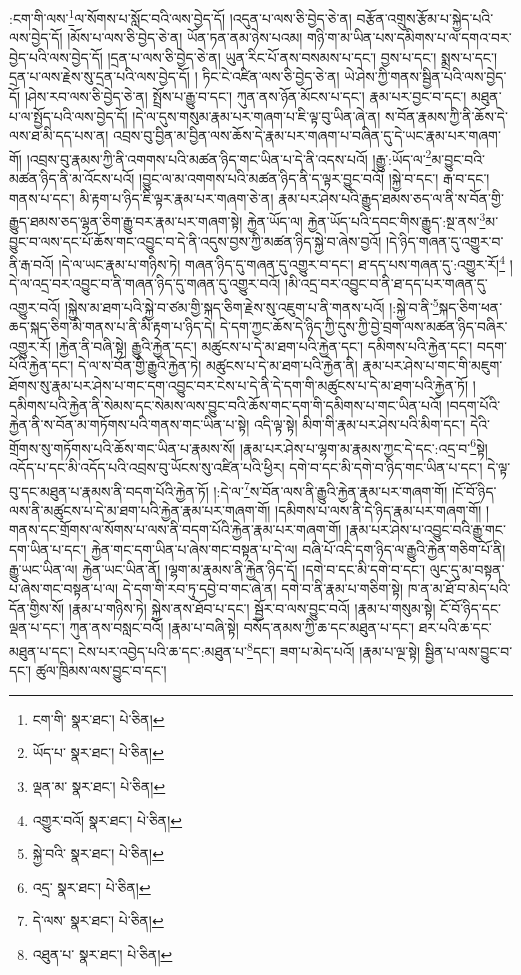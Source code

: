 :ངག་གི་ལས་\footnote{ངག་གི་  སྣར་ཐང་།  པེ་ཅིན། }ལ་སོགས་པ་སློང་བའི་ལས་བྱེད་དོ། །འདུན་པ་ལས་ཅི་བྱེད་ཅེ་ན། བརྩོན་འགྲུས་རྩོམ་པ་སྐྱེད་པའི་ལས་བྱེད་དོ། །མོས་པ་ལས་ཅི་བྱེད་ཅེ་ན། ཡོན་ཏན་ནམ་ཉེས་པའམ། གཉི་ག་མ་ཡིན་པས་དམིགས་པ་ལ་དགའ་བར་བྱེད་པའི་ལས་བྱེད་དོ། །དྲན་པ་ལས་ཅི་བྱེད་ཅེ་ན། ཡུན་རིང་པོ་ནས་བསམས་པ་དང་། བྱས་པ་དང་། སྨྲས་པ་དང་། དྲན་པ་ལས་རྗེས་སུ་དྲན་པའི་ལས་བྱེད་དོ། །
ཏིང་ངེ་འཛིན་ལས་ཅི་བྱེད་ཅེ་ན། ཡེ་ཤེས་ཀྱི་གནས་སྦྱིན་པའི་ལས་བྱེད་དོ། །ཤེས་རབ་ལས་ཅི་བྱེད་ཅེ་ན། སྤྲོས་པ་རྒྱུ་བ་དང་། ཀུན་ནས་ཉོན་མོངས་པ་དང་། རྣམ་པར་བྱང་བ་དང་། མཐུན་པ་ལ་སྤྱོད་པའི་ལས་བྱེད་དོ། །དེ་ལ་དུས་གསུམ་རྣམ་པར་གཞག་པ་ཇི་ལྟ་བུ་ཡིན་ཞེ་ན། ས་བོན་རྣམས་ཀྱི་ནི་ཆོས་དེ་ལས་ཐ་མི་དད་པས་ན། འབྲས་བུ་བྱིན་མ་བྱིན་ལས་ཆོས་དེ་རྣམ་པར་གཞག་པ་བཞིན་དུ་དེ་ཡང་རྣམ་པར་གཞག་གོ། །འབྲས་བུ་རྣམས་ཀྱི་ནི་འགགས་པའི་མཚན་ཉིད་གང་ཡིན་པ་དེ་ནི་འདས་པའོ། །རྒྱུ་:ཡོད་ལ་\footnote{ཡོད་པ་  སྣར་ཐང་།  པེ་ཅིན། }མ་བྱུང་བའི་མཚན་ཉིད་ནི་མ་འོངས་པའོ། །བྱུང་ལ་མ་འགགས་པའི་མཚན་ཉིད་ནི་ད་ལྟར་བྱུང་བའོ། །སྐྱེ་བ་དང་། རྒ་བ་དང་། གནས་པ་དང་། མི་རྟག་པ་ཉིད་ཇི་ལྟར་རྣམ་པར་གཞག་ཅེ་ན། རྣམ་པར་ཤེས་པའི་རྒྱུད་ཐམས་ཅད་ལ་ནི་ས་བོན་གྱི་རྒྱུད་ཐམས་ཅད་ལྷན་ཅིག་རྒྱུ་བར་རྣམ་པར་གཞག་སྟེ། རྐྱེན་ཡོད་ལ། རྐྱེན་ཡོད་པའི་དབང་གིས་རྒྱུད་:སྔ་ནས་\footnote{ལྡན་མ་  སྣར་ཐང་།  པེ་ཅིན། }མ་བྱུང་བ་ལས་དང་པོ་ཆོས་གང་འབྱུང་བ་དེ་ནི་འདུས་བྱས་ཀྱི་མཚན་ཉིད་སྐྱེ་བ་ཞེས་བྱའོ། །དེ་ཉིད་གཞན་དུ་འགྱུར་བ་ནི་རྒ་བའོ། །དེ་ལ་ཡང་རྣམ་པ་གཉིས་ཏེ། གཞན་ཉིད་དུ་གཞན་དུ་འགྱུར་བ་དང་། ཐ་དད་པས་གཞན་དུ་:འགྱུར་རོ།\footnote{འགྱུར་བའོ།  སྣར་ཐང་།  པེ་ཅིན། } །དེ་ལ་འདྲ་བར་འབྱུང་བ་ནི་གཞན་ཉིད་དུ་གཞན་དུ་འགྱུར་བའོ། །མི་འདྲ་བར་འབྱུང་བ་ནི་ཐ་དད་པར་གཞན་དུ་འགྱུར་བའོ། །སྐྱེས་མ་ཐག་པའི་སྐྱེ་བ་ཙམ་གྱི་སྐད་ཅིག་རྗེས་སུ་འཇུག་པ་ནི་གནས་པའོ། །:སྐྱེ་བ་ནི་\footnote{སྐྱེ་བའི་  སྣར་ཐང་།  པེ་ཅིན། }སྐད་ཅིག་ཕན་ཆད་སྐད་ཅིག་མི་གནས་པ་ནི་མི་རྟག་པ་ཉིད་དེ། དེ་དག་ཀྱང་ཆོས་དེ་ཉིད་ཀྱི་དུས་ཀྱི་བྱེ་བྲག་ལས་མཚན་ཉིད་བཞིར་འགྱུར་རོ། །རྐྱེན་ནི་བཞི་སྟེ། རྒྱུའི་རྐྱེན་དང་། མཚུངས་པ་དེ་མ་ཐག་པའི་རྐྱེན་དང་། དམིགས་པའི་རྐྱེན་དང་། བདག་པོའི་རྐྱེན་དང་། དེ་ལ་ས་བོན་གྱི་རྒྱུའི་རྐྱེན་ཏེ། མཚུངས་པ་དེ་མ་ཐག་པའི་རྐྱེན་ནི། རྣམ་པར་ཤེས་པ་གང་གི་མཇུག་ཐོགས་སུ་རྣམ་པར་ཤེས་པ་གང་དག་འབྱུང་བར་ངེས་པ་དེ་ནི་དེ་དག་གི་མཚུངས་པ་དེ་མ་ཐག་པའི་རྐྱེན་ཏོ། །དམིགས་པའི་རྐྱེན་ནི་སེམས་དང་སེམས་ལས་བྱུང་བའི་ཆོས་གང་དག་གི་དམིགས་པ་གང་ཡིན་པའོ། །བདག་པོའི་རྐྱེན་ནི་ས་བོན་མ་གཏོགས་པའི་གནས་གང་ཡིན་པ་སྟེ། འདི་ལྟ་སྟེ། མིག་གི་རྣམ་པར་ཤེས་པའི་མིག་དང་། དེའི་གྲོགས་སུ་གཏོགས་པའི་ཆོས་གང་ཡིན་པ་རྣམས་སོ། །རྣམ་པར་ཤེས་པ་ལྷག་མ་རྣམས་ཀྱང་དེ་དང་:འདྲ་བ་\footnote{འདྲ་  སྣར་ཐང་།  པེ་ཅིན། }སྟེ། འདོད་པ་དང་མི་འདོད་པའི་འབྲས་བུ་ཡོངས་སུ་འཛིན་པའི་ཕྱིར། དགེ་བ་དང་མི་དགེ་བ་ཉིད་གང་ཡིན་པ་དང་། དེ་ལྟ་བུ་དང་མཐུན་པ་རྣམས་ནི་བདག་པོའི་རྐྱེན་ཏོ། །:དེ་ལ་\footnote{དེ་ལས་  སྣར་ཐང་།  པེ་ཅིན། }ས་བོན་ལས་ནི་རྒྱུའི་རྐྱེན་རྣམ་པར་གཞག་གོ། །ངོ་བོ་ཉིད་ལས་ནི་མཚུངས་པ་དེ་མ་ཐག་པའི་རྐྱེན་རྣམ་པར་གཞག་གོ། །དམིགས་པ་ལས་ནི་དེ་ཉིད་རྣམ་པར་གཞག་གོ། །གནས་དང་གྲོགས་ལ་སོགས་པ་ལས་ནི་བདག་པོའི་རྐྱེན་རྣམ་པར་གཞག་གོ། །རྣམ་པར་ཤེས་པ་འབྱུང་བའི་རྒྱུ་གང་དག་ཡིན་པ་དང་། རྐྱེན་གང་དག་ཡིན་པ་ཞེས་གང་བསྟན་པ་དེ་ལ། བཞི་པོ་འདི་དག་ཉིད་ལ་རྒྱུའི་རྐྱེན་གཅིག་པོ་ནི། རྒྱུ་ཡང་ཡིན་ལ། རྐྱེན་ཡང་ཡིན་ནོ། །ལྷག་མ་རྣམས་ནི་རྐྱེན་ཉིད་དོ། །དགེ་བ་དང་མི་དགེ་བ་དང་། ལུང་དུ་མ་བསྟན་པ་ཞེས་གང་བསྟན་པ་ལ། དེ་དག་གི་རབ་ཏུ་དབྱེ་བ་གང་ཞེ་ན། དགེ་བ་ནི་རྣམ་པ་གཅིག་སྟེ། ཁ་ན་མ་ཐོ་བ་མེད་པའི་དོན་གྱིས་སོ། །རྣམ་པ་གཉིས་ཏེ། སྐྱེས་ནས་ཐོབ་པ་དང་། སྦྱོར་བ་ལས་བྱུང་བའོ། །རྣམ་པ་གསུམ་སྟེ། ངོ་བོ་ཉིད་དང་ལྡན་པ་དང་། ཀུན་ནས་བསླང་བའོ། །རྣམ་པ་བཞི་སྟེ། བསོད་ནམས་ཀྱི་ཆ་དང་མཐུན་པ་དང་། ཐར་པའི་ཆ་དང་མཐུན་པ་དང་། ངེས་པར་འབྱེད་པའི་ཆ་དང་:མཐུན་པ་\footnote{འཐུན་པ་  སྣར་ཐང་།  པེ་ཅིན། }དང་། ཟག་པ་མེད་པའོ། །རྣམ་པ་ལྔ་སྟེ། སྦྱིན་པ་ལས་བྱུང་བ་དང་། ཚུལ་ཁྲིམས་ལས་བྱུང་བ་དང་། 
